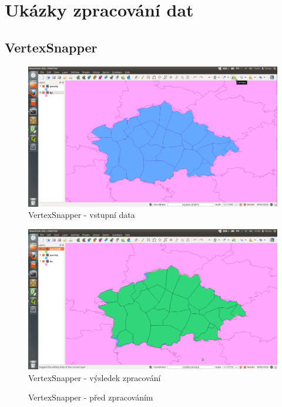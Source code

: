 \chapter{Ukázky zpracování dat}
\label{priloha-ukazky}

\section{VertexSnapper}
\label{ukazky-vs}

  \begin{figure}[H]
    \centering
      \includegraphics[width=400pt]{./pictures/test-vs1.png}
      \caption{VertexSnapper - vstupní data}
      \label{fig:vs1}
  \end{figure}

  \begin{figure}[H]
    \centering
      \includegraphics[width=400pt]{./pictures/test-vs2.png}
      \caption{VertexSnapper - výsledek zpracování}
      \label{fig:vs2}
  \end{figure}

  \begin{figure}[H]
    \centering
      \def\svgwidth{420pt}
      
      \caption{VertexSnapper - před zpracováním}
      \label{fig:vs3}
  \end{figure}

